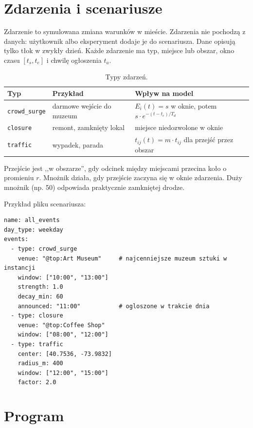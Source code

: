 \documentclass[11pt,a4paper]{article}
\begin{document}
\section{Zdarzenia i scenariusze}

Zdarzenie to symulowana zmiana warunków w mieście. Zdarzenia nie pochodzą z danych: użytkownik albo eksperyment dodaje je do scenariusza. Dane opisują tylko tłok w zwykły dzień. Każde zdarzenie ma typ, miejsce lub obszar, okno czasu $[t_s, t_e]$ i chwilę ogłoszenia $t_a$.

\begin{table}[h]
\centering
\caption{Typy zdarzeń.}
\begin{tabular}{lll}
\toprule
Typ & Przykład & Wpływ na model \\
\midrule
\texttt{crowd\_surge} & darmowe wejście do muzeum & $E_i(t) = s$ w oknie, potem $s \cdot e^{-(t - t_e)/T_d}$ \\
\texttt{closure} & remont, zamknięty lokal & miejsce niedozwolone w oknie \\
\texttt{traffic} & wypadek, parada & $t_{ij}(t) = m \cdot t_{ij}$ dla przejść przez obszar \\
\bottomrule
\end{tabular}
\end{table}

Przejście jest ,,w obszarze'', gdy odcinek między miejscami przecina koło o promieniu $r$. Mnożnik działa, gdy przejście zaczyna się w oknie zdarzenia. Duży mnożnik (np. 50) odpowiada praktycznie zamkniętej drodze.

Przykład pliku scenariusza:
\begin{verbatim}
name: all_events
day_type: weekday
events:
  - type: crowd_surge
    venue: "@top:Art Museum"     # najcenniejsze muzeum sztuki w instancji
    window: ["10:00", "13:00"]
    strength: 1.0
    decay_min: 60
    announced: "11:00"           # ogloszone w trakcie dnia
  - type: closure
    venue: "@top:Coffee Shop"
    window: ["08:00", "12:00"]
  - type: traffic
    center: [40.7536, -73.9832]
    radius_m: 400
    window: ["12:00", "15:00"]
    factor: 2.0
\end{verbatim}

\section{Program}
\end{document}
